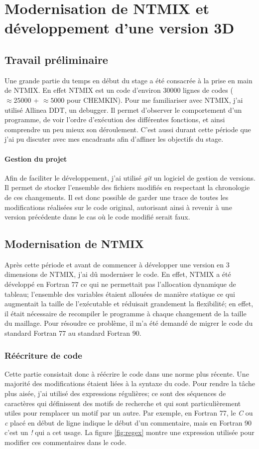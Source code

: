 \section{Modernisation de NTMIX et développement d'une version 3D}
\label{sec:part1}

\subsection{Travail préliminaire}
Une grande partie du temps en début du stage a été consacrée à la prise en main de NTMIX. En effet NTMIX est un code d'environ 30000 lignes de codes ($\approx 25000$ + $\approx 5000$ pour CHEMKIN). Pour me familiariser avec NTMIX, j'ai utilisé Allinea DDT, un debugger. Il permet d'observer le comportement d'un programme, de voir l'ordre d'exécution des différentes fonctions, et ainsi comprendre un peu mieux son déroulement. C'est aussi durant cette période que j'ai pu discuter avec mes encadrants afin d'affiner les objectifs du stage.

\paragraph{Gestion du projet}Afin de faciliter le développement, j'ai utilisé \textit{git} un logiciel de gestion de versions. Il permet de stocker l'ensemble des fichiers modifiés en respectant la chronologie de ces changements. Il est donc possible de garder une trace de toutes les modifications réalisées sur le code original, autorisant ainsi à revenir à une version précédente dans le cas où le code modifié serait faux.
 
\subsection{Modernisation de NTMIX}
Après cette période et avant de commencer à développer une version en 3 dimensions de NTMIX, j'ai dû moderniser le code. En effet, NTMIX a été développé en Fortran 77 ce qui ne permettait pas l'allocation dynamique de tableau; l'ensemble des variables étaient allouées de manière statique ce qui augmentait la taille de l'exécutable et réduisait grandement la flexibilité; en effet, il était nécessaire de recompiler le programme à chaque changement de la taille du maillage. Pour résoudre ce problème, il m'a été demandé de migrer le code du standard Fortran 77 au standard Fortran 90.

\subsubsection{Réécriture de code}Cette partie consistait donc à réécrire le code dans une norme plus récente. Une majorité des modifications étaient liées à la syntaxe du code. Pour rendre la tâche plus aisée, j'ai utilisé des expressions régulières; ce sont des séquences de caractères qui définissent des motifs de recherche et qui sont particulièrement utiles pour remplacer un motif par un autre. Par exemple, en Fortran 77, le \textit{C} ou \textit{c} placé en début de ligne indique le début d'un commentaire, mais en Fortran 90 c'est un \textit{!} qui a cet usage. La figure \ref{fig:regex} montre une expression utilisée pour modifier ces commentaires dans le code.

